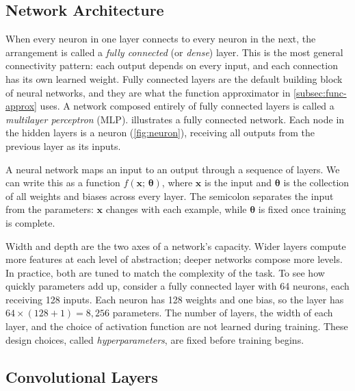 

\subsection{Network Architecture}
\label{subsec:network-architecture}

When every neuron in one layer connects to every neuron in the
next, the arrangement is called a \emph{fully connected} (or
\emph{dense}) layer. This is the most general connectivity
pattern: each output depends on every input, and each connection
has its own learned weight. Fully connected layers are the
default building block of neural networks, and they are what the
function approximator in \cref{subsec:func-approx} uses. A network
composed entirely of fully connected layers is called a \emph{multilayer
perceptron} (MLP).
 illustrates a fully connected network.
Each node in the hidden layers is a neuron (\cref{fig:neuron}),
receiving all outputs from the previous layer as its inputs.



\smallskip
A neural network maps an input to an output through a sequence of
layers. We can write this as a function $f(\mathbf{x};\,
\boldsymbol{\theta})$, where $\mathbf{x}$ is the input and
$\boldsymbol{\theta}$ is the collection of all weights and biases across
every layer. The semicolon separates the input from the parameters:
$\mathbf{x}$ changes with each example, while $\boldsymbol{\theta}$ is
fixed once training is complete.

\smallskip
Width and depth are the two axes of a network's capacity. Wider
layers compute more features at each level of abstraction; deeper
networks compose more levels. In practice, both are tuned to match
the complexity of the task.
To see how quickly parameters add up, consider a fully connected layer
with 64 neurons, each receiving 128 inputs. Each neuron has 128 weights
and one bias, so the layer has $64 \times (128 + 1) = 8{,}256$
parameters.
The number of layers, the width of each layer, and the choice of
activation function are not learned during training. These design
choices, called \emph{hyperparameters}, are fixed before training begins.

\subsection{Convolutional Layers}
\label{subsec:conv-layers}

